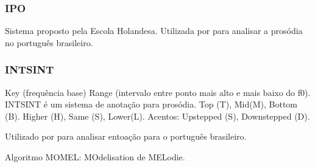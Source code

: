\subsubsection{IPO}
Sistema proposto pela Escola Holandesa. Utilizada por \cite{ipo} para analisar a
prosódia no português brasileiro.
\subsubsection{INTSINT}
Key (frequência base)
Range (intervalo entre ponto mais alto e mais baixo do f0).
INTSINT é um sistema de anotação para prosódia. Top (T), Mid(M), Bottom (B).
Higher (H), Same (S), Lower(L). Acentos: Upstepped (S), Downstepped (D).

Utilizado por \cite{intsintpt} para analisar entoação para o português brasileiro.

Algoritmo MOMEL: MOdelisation de MELodie.

